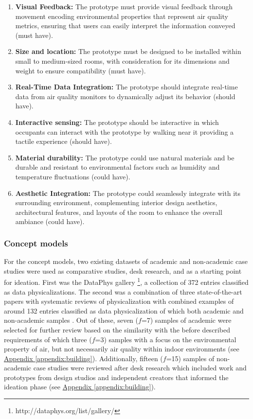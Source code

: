\begin{enumerate}
    \renewcommand{\labelenumi}{R\arabic{enumi}:}
    \item \textbf{Visual Feedback:} The prototype must provide visual feedback through movement encoding environmental properties that represent air quality metrics, ensuring that users can easily interpret the information conveyed (must have).
    \item \textbf{Size and location:} The prototype must be designed to be installed within small to medium-sized rooms, with consideration for its dimensions and weight to ensure compatibility (must have).
    \item \textbf{Real-Time Data Integration:} The prototype should integrate real-time data from air quality monitors to dynamically adjust its behavior (should have).
    \item \textbf{Interactive sensing:} The prototype should be interactive in which occupants can interact with the prototype by walking near it providing a tactile experience (should have).
    \item \textbf{Material durability:} The prototype could use natural materials and be durable and resistant to environmental factors such as humidity and temperature fluctuations (could have).
    \item \textbf{Aesthetic Integration:} The prototype could seamlessly integrate with its surrounding environment, complementing interior design aesthetics, architectural features, and layouts of the room to enhance the overall ambiance (could have).
\end{enumerate}

\subsubsection{Concept models}

For the concept models, two existing datasets of academic and non-academic case studies were used as comparative studies, desk research, and as a starting point for ideation. First was the DataPhys gallery \footnote{http://dataphys.org/list/gallery/}, a collection of 372 entries classified as data physicalizations. The second was a combination of three state-of-the-art papers with systematic reviews of physicalization with combined examples of around 132 entries classified as data physicalization of which both academic and non-academic samples \cite{sauve_physecology_2022, anhalt_university_germany_design_2022, ranasinghe_encoding_2023}. Out of these, seven ($f$=7) samples of academic were selected for further review based on the similarity with the before described requirements of which three ($f$=3) samples with a focus on the environmental property of air, but not necessarily air quality within indoor environments (see \hyperref[appendix:building]{Appendix \ref*{appendix:building}}). Additionally, fifteen ($f$=15) samples of non-academic case studies were reviewed after desk research which included work and prototypes from design studios and independent creators that informed the ideation phase (see \hyperref[appendix:building]{Appendix \ref*{appendix:building}}).

